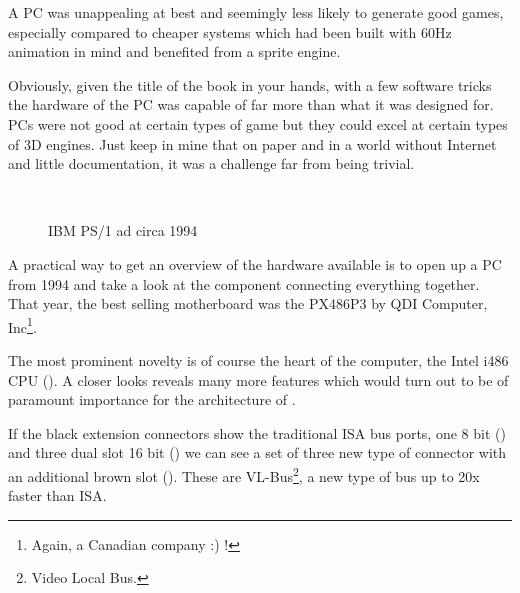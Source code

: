 \par
 A PC was unappealing at best and seemingly less likely to generate good games, especially compared to cheaper systems which had been built with 60Hz animation in mind and benefited from a sprite engine.\\
 \par
  Obviously, given the title of the book in your hands, with a few software tricks the hardware of the PC was capable of far more than what it was designed for. PCs were not good at certain types of game but they could excel at certain types of 3D engines. Just keep in mine that on paper and in a world without Internet and little documentation, it was a challenge far from being trivial.\\
\par

\\
\par
\begin{figure}[H] \centering
{}
\caption{IBM PS/1 ad circa 1994}
\label{ibm_ps1_top}
\end{figure}


















\cleartoleftpage
 
A practical way to get an overview of the hardware available is to open up a PC from 1994 and take a look at the component connecting everything together. That year, the best selling motherboard was the PX486P3 by QDI Computer, Inc\footnote{Again, a Canadian company :) !}.\\

\par
The most prominent novelty is of course the heart of the computer, the Intel i486 CPU (). A closer looks reveals many more features which would turn out to be of paramount importance for the architecture of \doom.\\
\par 
If the black extension connectors show the traditional ISA bus ports, one 8 bit () and three dual slot 16 bit () we can see a set of three new type of connector with an additional brown slot (). These are VL-Bus\footnote{Video Local Bus.}, a new type of bus up to 20x faster than ISA.

